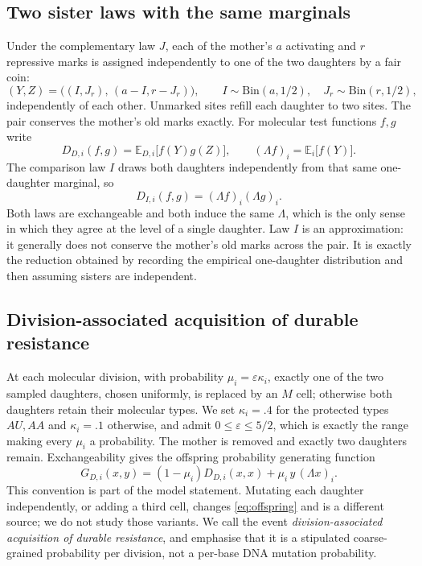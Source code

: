 \documentclass[11pt]{article}
\theoremstyle{remark}
\newcommand{\E}{\mathbb E}
\newcommand{\eps}{\varepsilon}
\begin{document}
\subsection{Two sister laws with the same marginals}
Under the complementary law $J$, each of the mother's $a$ activating and $r$
repressive marks is assigned independently to one of the two daughters by a fair
coin:
\begin{equation}
 (Y,Z)=\bigl((I,J_r),\,(a-I,r-J_r)\bigr),\qquad
 I\sim\mathrm{Bin}(a,1/2),\quad J_r\sim\mathrm{Bin}(r,1/2),\label{eq:Jlaw}
\end{equation}
independently of each other. Unmarked sites refill each daughter to two sites.
The pair conserves the mother's old marks exactly. For molecular test functions
$f,g$ write
\[
 D_{D,i}(f,g)=\E_{D,i}\bigl[f(Y)g(Z)\bigr],\qquad
 (\Lambda f)_i=\E_i\bigl[f(Y)\bigr].
\]
The comparison law $I$ draws both daughters independently from that same
one-daughter marginal, so
\begin{equation}
 D_{I,i}(f,g)=(\Lambda f)_i(\Lambda g)_i.\label{eq:Ilaw}
\end{equation}
Both laws are exchangeable and both induce the same $\Lambda$, which is the only
sense in which they agree at the level of a single daughter. Law $I$ is an
approximation: it generally does not conserve the mother's old marks across the
pair. It is exactly the reduction obtained by recording the empirical
one-daughter distribution and then assuming sisters are independent.

\subsection{Division-associated acquisition of durable resistance}
At each molecular division, with probability $\mu_i=\eps\kappa_i$, exactly one of
the two sampled daughters, chosen uniformly, is replaced by an $M$ cell;
otherwise both daughters retain their molecular types. We set $\kappa_i=.4$ for
the protected types $AU,AA$ and $\kappa_i=.1$ otherwise, and admit
$0\le\eps\le5/2$, which is exactly the range making every $\mu_i$ a probability.
The mother is removed and exactly two daughters remain. Exchangeability gives
the offspring probability generating function
\begin{equation}
 G_{D,i}(x,y)=(1-\mu_i)D_{D,i}(x,x)+\mu_i\,y\,(\Lambda x)_i.\label{eq:offspring}
\end{equation}
This convention is part of the model statement. Mutating each daughter
independently, or adding a third cell, changes \eqref{eq:offspring} and is a
different source; we do not study those variants. We call the event
\emph{division-associated acquisition of durable resistance}, and emphasise that
it is a stipulated coarse-grained probability per division, not a per-base DNA
mutation probability.
\end{document}
